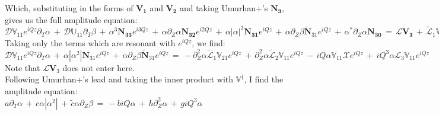 \documentclass[letterpaper,12pt]{article}
\begin{document}
Which, substituting in the forms of $\mathbf{V_1}$ and $\mathbf{V_2}$ and taking Umurhan+'s $\mathbf{N_3}$, gives us the full amplitude equation:\\

$\mathcal{D}\mathbb{V}_{11} e^{iQz}\partial_T \alpha \, + \, \mathcal{D}\mathbb{U}_{11} \partial_T \beta \, + \, \alpha^3 \mathbf{N_{33}} e^{i3Qz} \, + \, \alpha \partial_Z \alpha \mathbf{N_{32}} e^{i2Qz} \, + \, \alpha\left|\alpha\right|^2 \mathbf{N_{31}} e^{iQz} \, + \, \alpha \partial_Z\beta \widetilde{\mathbf{N}}_{31} e^{iQz} \, + \, \alpha^* \partial_Z \alpha \mathbf{N_{30}} \, = \, \mathcal{L}\mathbf{V_3} \, + \, \widetilde{\mathcal{L}}_1 \mathbb{V}_{22} 2 \alpha \partial_Z \alpha e^{i2Qz} \, + \, \widetilde{\mathcal{L}}_1 \mathbb{V}_{20} 2 \left|\alpha\right| \partial_Z \alpha \, - \, \widetilde{\mathcal{L}}_1 \mathbb{V}_{21} \partial_Z^2 \alpha e^{iQz} \, - \, \widetilde{\mathcal{L}}_1 \mathbb{U}_{20} \partial_Z^2 \beta \, + \, \widetilde{\mathcal{L}}_2 \mathbb{V}_{11} e^{iQz} \partial_Z^2 \alpha \, + \, \widetilde{\mathcal{L}}_2 \mathbb{U}_{11} \partial_Z^2 \beta \, - \, \mathcal{X}\mathbb{V}_{11} e^{iQz} \partial_z \alpha \, - \, \mathcal{X} \mathbb{U}_{11} \partial_z \beta \, + \, \mathcal{L}_3 \mathbb{V}_{11} e^{iQz} iQ^3 \alpha $\\

Taking only the terms which are resonant with $e^{iQz}$, we find: \\

$\mathcal{D} \mathbb{V}_{11} e^{iQz}\partial_T \alpha \, + \, \alpha \left| \alpha^2 \right| \mathbf{N}_{31} e^{iQz} \, + \, \alpha \partial_Z \beta \widetilde{\mathbf{N}}_{31} e^{iQz} \, = \, - \partial_Z^2 \alpha \widetilde{\mathcal{L}}_1 \mathbb{V}_{21} e^{iQz} \, + \, \partial_Z^2 \alpha \widetilde{\mathcal{L}}_2 \mathbb{V}_{11} e^{iQz} \, - \, i Q \alpha \mathbb{V}_{11}\mathcal{X}e^{iQz} \, + \, iQ^3 \alpha \mathcal{L}_3 \mathbb{V}_{11} e^{iQz}$ \\

Note that $\mathcal{L}\mathbf{V}_3$ does not enter here.\\

Following Umurhan+'s lead and taking the inner product with $\mathbb{V}^\dagger$, I find the amplitude equation: \\

$a \partial_T \alpha \, + \, c \alpha \left|\alpha^2\right| \, + \, \widetilde{c} \alpha \partial_Z \beta \, = \, - b i Q \alpha \, + \, h \partial_Z^2 \alpha \, + \, g i Q^3 \alpha$ \\
\end{document}
